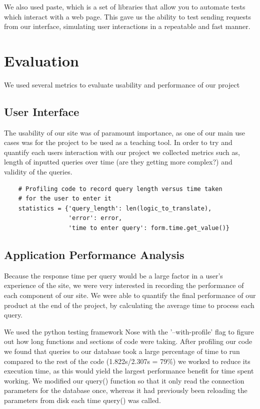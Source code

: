 \documentclass[a4paper, 11pt]{article}
\begin{document}
  We also used paste, which is a set of libraries that allow you to automate
  tests which interact with a web page. This gave us the ability to test
  sending requests from our interface, simulating user interactions in a
  repeatable and fast manner.


\section{Evaluation}

    We used several metrics to evaluate usability and performance of our project
    \subsection{User Interface}
    The usability of our site was of paramount importance, as one of our main
    use cases was for the project to be used as a teaching tool. In order to try
    and quantify each users interaction with our project we collected metrics
    such as, length of inputted queries over time (are they getting more
    complex?) and validity of the queries.

    \begin{verbatim}
    # Profiling code to record query length versus time taken
    # for the user to enter it
    statistics = {'query_length': len(logic_to_translate),
                  'error': error,
                  'time to enter query': form.time.get_value()}
    \end{verbatim}

    \subsection{Application Performance Analysis}

    Because the response time per query would be a large factor in a user's
    experience of the site, we were very interested in recording the performance
    of each component of our site. We were able to quantify the final
    performance of our product at the end of the project, by calculating the
    average time to process each query.

    We used the python testing framework Nose with the '--with-profile' flag to
    figure out how long functions and sections of code were taking. 
    After profiling our code we found that queries to our database took a large
    percentage of time to run compared to the rest of the code (1.822s/2.307s =
    79\%) we worked to reduce its execution time, as this would yield the largest
    performance benefit for time spent working. 
    We modified our query() function so that it only read the connection 
    parameters for the database once, whereas it had previously been reloading 
    the  parameters from disk each time query() was called.  
\end{document}
